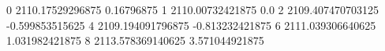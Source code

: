 0 2110.17529296875 0.16796875
1 2110.00732421875 0.0
2 2109.407470703125 -0.599853515625
4 2109.194091796875 -0.813232421875
6 2111.039306640625 1.031982421875
8 2113.578369140625 3.571044921875
